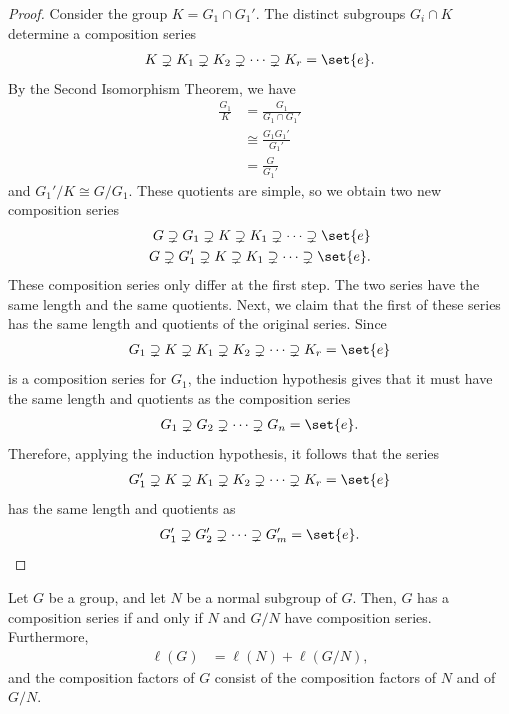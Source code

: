 \documentclass[10pt]{mypackage}
\begin{document}
\begin{proof}
  Consider the group $K = G_1\cap G_1'$. The distinct subgroups $G_i\cap K$ determine a composition series
  \begin{align*}
    K \supsetneq K_1\supsetneq K_2\supsetneq \cdots\supsetneq K_r = \set{e}.
  \end{align*}
  By the Second Isomorphism Theorem, we have
  \begin{align*}
    \frac{G_1}{K} &= \frac{G_1}{G_1\cap G_1'}\\
                  &\cong \frac{G_1G_1'}{G_1'}\\
                  &= \frac{G}{G_1'}
  \end{align*}
  and $G_1'/K \cong G/G_1$. These quotients are simple, so we obtain two new composition series
  \begin{align*}
    G \supsetneq G_1 \supsetneq K \supsetneq K_1\supsetneq\cdots\supsetneq \set{e}\\
    G\supsetneq G_1'\supsetneq K \supsetneq K_1 \supsetneq \cdots\supsetneq \set{e}.
  \end{align*}
  These composition series only differ at the first step. The two series have the same length and the same quotients. Next, we claim that the first of these series has the same length and quotients of the original series. Since
  \begin{align*}
    G_1\supsetneq K\supsetneq K_1\supsetneq K_2\supsetneq\cdots\supsetneq K_r = \set{e}
  \end{align*}
  is a composition series for $G_1$, the induction hypothesis gives that it must have the same length and quotients as the composition series
  \begin{align*}
    G_1\supsetneq G_2\supsetneq \cdots \supsetneq G_n = \set{e}.
  \end{align*}
  Therefore, applying the induction hypothesis, it follows that the series
  \begin{align*}
    G_1'\supsetneq K \supsetneq K_1\supsetneq K_2\supsetneq \cdots \supsetneq K_r = \set{e}
  \end{align*}
  has the same length and quotients as 
  \begin{align*}
    G_1'\supsetneq G_2'\supsetneq\cdots\supsetneq G_m' = \set{e}.
  \end{align*}
\end{proof}
\begin{proposition}
  Let $G$ be a group, and let $N$ be a normal subgroup of $G$. Then, $G$ has a composition series if and only if $N$ and $G/N$ have composition series. Furthermore,
  \begin{align*}
    \ell\left( G \right) &= \ell\left( N \right) + \ell\left( G/N \right),
  \end{align*}
  and the composition factors of $G$ consist of the composition factors of $N$ and of $G/N$.
\end{proposition}
\end{document}
